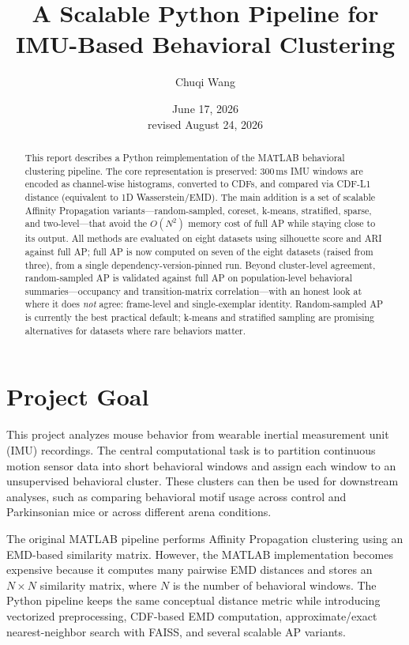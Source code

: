 \documentclass[11pt]{article}
\title{\textbf{A Scalable Python Pipeline for IMU-Based Behavioral Clustering}}
\author{Chuqi Wang}
\date{June 17, 2026 \\ \normalsize revised August 24, 2026}
\begin{document}
\maketitle

\begin{abstract}
This report describes a Python reimplementation of the MATLAB behavioral clustering pipeline. The core representation is preserved: 300\,ms IMU windows are encoded as channel-wise histograms, converted to CDFs, and compared via CDF-L1 distance (equivalent to 1D Wasserstein/EMD). The main addition is a set of scalable Affinity Propagation variants---random-sampled, coreset, k-means, stratified, sparse, and two-level---that avoid the $O(N^2)$ memory cost of full AP while staying close to its output. All methods are evaluated on eight datasets using silhouette score and ARI against full AP; full AP is now computed on seven of the eight datasets (raised from three), from a single dependency-version-pinned run. Beyond cluster-level agreement, random-sampled AP is validated against full AP on population-level behavioral summaries---occupancy and transition-matrix correlation---with an honest look at where it does \emph{not} agree: frame-level and single-exemplar identity. Random-sampled AP is currently the best practical default; k-means and stratified sampling are promising alternatives for datasets where rare behaviors matter.
\end{abstract}

\section{Project Goal}

This project analyzes mouse behavior from wearable inertial measurement unit (IMU) recordings. The central computational task is to partition continuous motion sensor data into short behavioral windows and assign each window to an unsupervised behavioral cluster. These clusters can then be used for downstream analyses, such as comparing behavioral motif usage across control and Parkinsonian mice or across different arena conditions.

The original MATLAB pipeline performs Affinity Propagation clustering using an EMD-based similarity matrix. However, the MATLAB implementation becomes expensive because it computes many pairwise EMD distances and stores an $N \times N$ similarity matrix, where $N$ is the number of behavioral windows. The Python pipeline keeps the same conceptual distance metric while introducing vectorized preprocessing, CDF-based EMD computation, approximate/exact nearest-neighbor search with FAISS, and several scalable AP variants.
\end{document}
